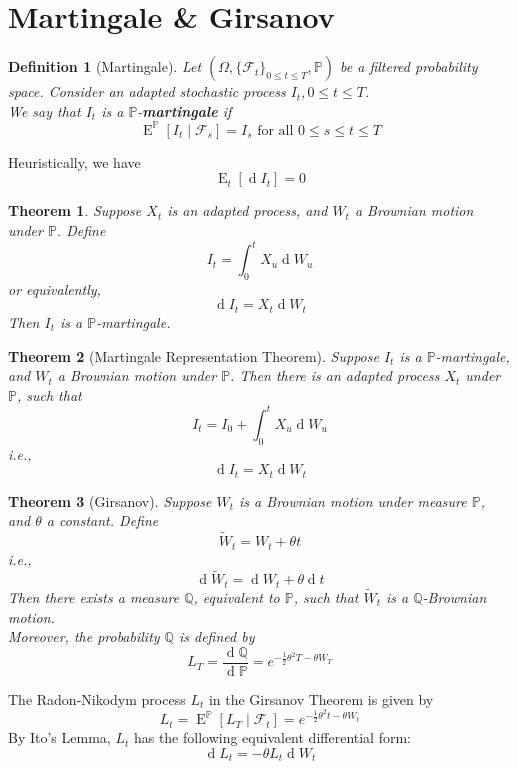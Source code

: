 \documentclass[12pt]{article}
\newtheorem{definition}{Definition}[section]
\newtheorem{theorem}{Theorem}[section]
\theoremstyle{definition}
\DeclareMathOperator{\diff}{d}
\DeclareMathOperator{\expec}{E}
\begin{document}
\section{Martingale \& Girsanov}
\begin{definition}[Martingale]
\normalfont Let $(\Omega, \{\mathcal{F}_t\}_{0\leq t\leq T}, \mathbb{P})$ be a filtered probability space. Consider an adapted stochastic process $I_t,0\leq t\leq T$. \\
We say that $I_t$ is a $\mathbb{P}$-\textbf{martingale} if
\[
\expec^\mathbb{P}[I_t\mid \mathcal{F}_s]=I_s\text{  for all }0\leq s\leq t\leq T
\]
\end{definition}
Heuristically, we have
\[
\expec_t[\diff I_t]=0
\]
\begin{theorem}
\normalfont Suppose $X_t$ is an adapted process, and $W_t$ a Brownian motion under $\mathbb{P}$. Define
\[
I_t=\int_0^t X_u\diff W_u
\]
or equivalently,
\[
\diff I_t=X_t\diff W_t
\]
Then $I_t$ is a $\mathbb{P}$-martingale.
\end{theorem}
\begin{theorem}[Martingale Representation Theorem]
\normalfont Suppose $I_t$ is a $\mathbb{P}$-martingale, and $W_t$ a Brownian motion under $\mathbb{P}$. Then there is an adapted process $X_t$ under $\mathbb{P}$, such that
\[
I_t=I_0+\int_0^t X_u\diff W_u
\]
i.e.,
\[
\diff I_t=X_t\diff W_t
\]
\end{theorem}
\begin{theorem}[Girsanov]
\normalfont Suppose $W_t$ is a Brownian motion under measure $\mathbb{P}$, and $\theta$ a constant. Define
\[
\tilde{W}_t=W_t+\theta t
\]
i.e.,
\[
\diff \tilde{W}_t=\diff W_t+\theta \diff t
\]
Then there exists a measure $\mathbb{Q}$, equivalent to $\mathbb{P}$, such that $\tilde{W}_t$ is a $\mathbb{Q}$-Brownian motion.\\
Moreover, the probability $\mathbb{Q}$ is defined by
\[
L_T=\frac{\diff \mathbb{Q}}{\diff \mathbb{P}} = e^{-\frac{1}{2}\theta^2T-\theta W_T}
\]
\end{theorem}
The Radon-Nikodym process $L_t$ in the Girsanov Theorem is given by
\[
L_t=\expec^\mathbb{P}[L_T\mid \mathcal{F}_t]=e^{-\frac{1}{2}\theta^2t-\theta W_t}
\]
By Ito's Lemma, $L_t$ has the following equivalent differential form:
\[
\diff L_t =-\theta L_t\diff W_t
\]
\end{document}

